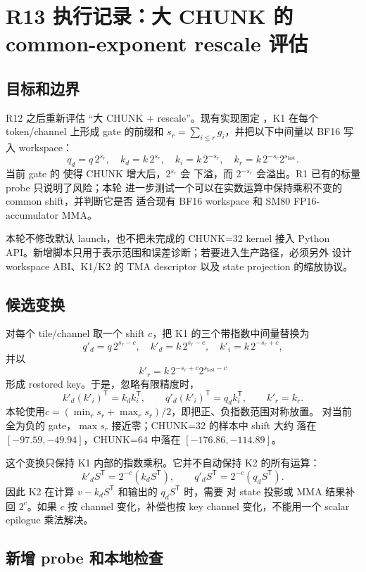 \section{R13 执行记录：大 CHUNK 的 common-exponent rescale 评估}

\subsection{目标和边界}

R12 之后重新评估 ``大 CHUNK + rescale''。现有实现固定
，K1 在每个 token/channel 上形成 gate 的前缀和
\(s_r=\sum_{i\leq r}g_i\)，并把以下中间量以 BF16 写入 workspace：
\[
 q_d=q\,2^{s_r},\quad k_d=k\,2^{s_r},\quad
 k_i=k\,2^{-s_r},\quad k_r=k\,2^{-s_r}2^{s_{\mathrm{last}}}.
\]
当前 gate 的  使得 CHUNK 增大后，\(2^{s_r}\) 会
下溢，而 \(2^{-s_r}\) 会溢出。R1 已有的标量 probe 只说明了风险；本轮
进一步测试一个可以在实数运算中保持乘积不变的 common shift，并判断它是否
适合现有 BF16 workspace 和 SM80 FP16-accumulator MMA。

本轮不修改默认 \FlashKDA{} launch，也不把未完成的 CHUNK=32 kernel 接入
Python API。新增脚本只用于表示范围和误差诊断；若要进入生产路径，必须另外
设计 workspace ABI、K1/K2 的 TMA descriptor 以及 state projection 的缩放协议。

\subsection{候选变换}

对每个 tile/channel 取一个 shift \(c\)，把 K1 的三个带指数中间量替换为
\[
 q'_d=q\,2^{s_r-c},\quad k'_d=k\,2^{s_r-c},\quad
 k'_i=k\,2^{-s_r+c},
\]
并以
\[
 k'_r=k\,2^{-s_r+c}2^{s_{\mathrm{last}}-c}
\]
形成 restored key。于是，忽略有限精度时，
\[
 k'_d(k'_i)^\mathsf{T}=k_d k_i^\mathsf{T},\qquad
 q'_d(k'_i)^\mathsf{T}=q_d k_i^\mathsf{T},\qquad
 k'_r=k_r.
\]
本轮使用\(c=(\min_r s_r+\max_r s_r)/2\)，即把正、负指数范围对称放置。
对当前全为负的 gate，\(\max s_r\) 接近零；CHUNK=32 的样本中 shift 大约
落在 \([-97.59,-49.94]\)，CHUNK=64 中落在 \([-176.86,-114.89]\)。

这个变换只保持 K1 内部的指数乘积。它并不自动保持 K2 的所有运算：
\[
 k'_d S^\mathsf{T}=2^{-c}(k_d S^\mathsf{T}),\qquad
 q'_d S^\mathsf{T}=2^{-c}(q_d S^\mathsf{T}).
\]
因此 K2 在计算 \(v-k_dS^\mathsf{T}\) 和输出的 \(q_dS^\mathsf{T}\) 时，需要
对 state 投影或 MMA 结果补回 \(2^c\)。如果 \(c\) 按 channel 变化，补偿也按
key channel 变化，不能用一个 scalar epilogue 乘法解决。

\subsection{新增 probe 和本地检查}

